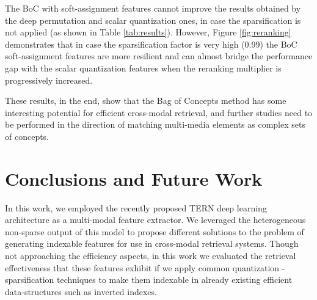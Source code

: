 \documentclass[conference]{IEEEtran}
\begin{document}
The BoC with soft-assignment features cannot improve the results obtained by the deep permutation and scalar quantization ones, in case the sparsification is not applied (as shown in Table \ref{tab:results}). However, Figure \ref{fig:reranking} demonstrates that in case the sparsification factor is very high (0.99) the BoC soft-assignment features are more resilient and can almost bridge the performance gap with the scalar quantization features when the reranking multiplier is progressively increased. 

These results, in the end, show that the Bag of Concepts method has some interesting potential for efficient cross-modal retrieval, and further studies need to be performed in the direction of matching multi-media elements as complex sets of concepts.

\section{Conclusions and Future Work}
In this work, we employed the recently proposed TERN deep learning architecture as a multi-modal feature extractor. We leveraged the heterogeneous non-sparse output of this model to propose different solutions to the problem of generating indexable features for use in cross-modal retrieval systems.
Though not approaching the efficiency aspects, in this work we evaluated the retrieval effectiveness that these features exhibit if we apply common quantization - sparsification techniques to make them indexable in already existing efficient data-structures such as inverted indexes.
\end{document}
